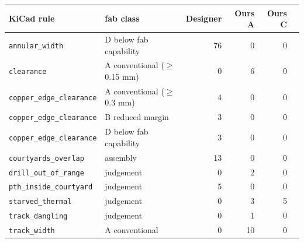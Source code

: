 \begin{tabular}{llrrrr}
\toprule
KiCad rule & fab class & Designer & Ours A & Ours C \\
\midrule
\texttt{annular\_width} & D below fab capability & 76 & 0 & 0 \\
\texttt{clearance} & A conventional ($\geq$ 0.15 mm) & 0 & 6 & 0 \\
\texttt{copper\_edge\_clearance} & A conventional ($\geq$ 0.3 mm) & 4 & 0 & 0 \\
\texttt{copper\_edge\_clearance} & B reduced margin & 3 & 0 & 0 \\
\texttt{copper\_edge\_clearance} & D below fab capability & 3 & 0 & 0 \\
\texttt{courtyards\_overlap} & assembly & 13 & 0 & 0 \\
\texttt{drill\_out\_of\_range} & judgement & 0 & 2 & 0 \\
\texttt{pth\_inside\_courtyard} & judgement & 5 & 0 & 0 \\
\texttt{starved\_thermal} & judgement & 0 & 3 & 5 \\
\texttt{track\_dangling} & judgement & 0 & 1 & 0 \\
\texttt{track\_width} & A conventional & 0 & 10 & 0 \\
\bottomrule
\end{tabular}
